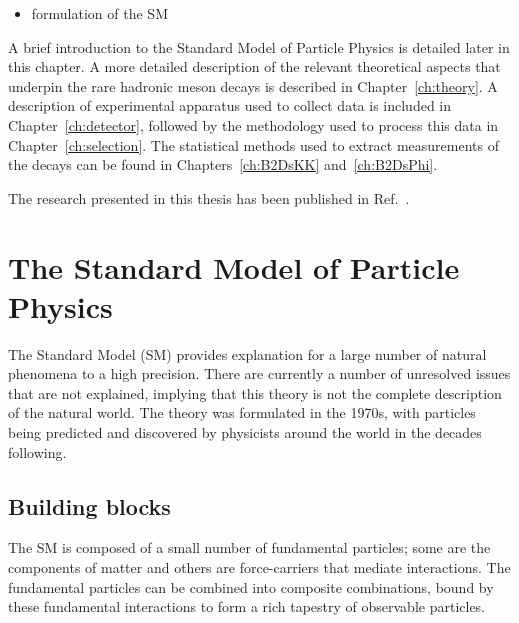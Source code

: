 {\color{Red}
\begin{itemize}
\item formulation of the SM
\end{itemize}}





A brief introduction to the Standard Model of Particle Physics is detailed later in this chapter. A more detailed description of the relevant theoretical aspects that underpin the rare hadronic \B meson decays is described in Chapter~\ref{ch:theory}. A description of experimental apparatus used to collect data is included in Chapter~\ref{ch:detector}, followed by the methodology used to process this data in Chapter~\ref{ch:selection}. The statistical methods used to extract measurements of the decays can be found in Chapters~\ref{ch:B2DsKK} and~\ref{ch:B2DsPhi}.


The research presented in this thesis has been published in Ref.~\cite{LHCb-PAPER-2017-032}. 



\section{The Standard Model of Particle Physics}

The Standard Model (SM) provides explanation for a large number of natural phenomena to a high precision. There are currently a number of unresolved issues that are not explained, implying that this theory is not the complete description of the natural world. The theory was formulated in the 1970s, with particles being predicted and discovered by physicists around the world in the decades following.

\subsection{Building blocks}

The SM is composed of a small number of fundamental particles; some are the components of matter and others are force-carriers that mediate interactions. The fundamental particles can be combined into composite combinations, bound by these fundamental interactions to form a rich tapestry of observable particles.

